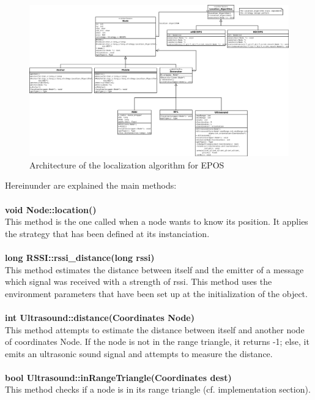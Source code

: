 \documentclass[a4paper,10pt]{article}
\begin{document}
\begin{landscape}
\begin{figure}[H]
\centering
 \includegraphics[width=1.5\textwidth]{./classdiagram.png}
\caption{Architecture of the localization algorithm for EPOS}
\end{figure}
\end{landscape}
\noindent 
Hereinunder are explained the main methods:\\ \\
\textbf{void Node::location()} \\
This method is the one called when a node wants to know its position. It applies the strategy that has been defined at its instanciation.\\ \\
\textbf{long RSSI::rssi\_distance(long rssi)}\\
This method estimates the distance between itself and the emitter of a message which signal was received with a strength of rssi. This method
uses the environment parameters that have been set up at the initialization of the object.\\ \\
\textbf{int Ultrasound::distance(Coordinates Node)}\\
This method attempts to estimate the distance between itself and another node of coordinates Node. If the node is not in the range triangle, it
returns -1; else, it emits an ultrasonic sound signal and attempts to measure the distance.\\ \\
\textbf{bool Ultrasound::inRangeTriangle(Coordinates dest)}\\
This method checks if a node is in its range triangle (cf. implementation section).\\ \\
\end{document}
